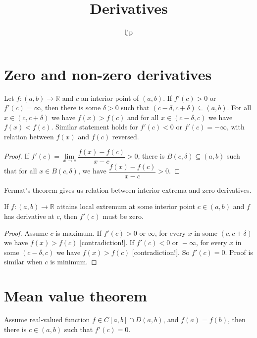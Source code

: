 \documentclass{article}
\title{Derivatives}
\author{ljp}
\newcommand{\R}{\mathbb R}
\begin{document}
\maketitle
\tableofcontents
\section{Zero and non-zero derivatives}
\begin{theorem}
    Let $ f \colon (a, b) \to \R $ and $ c $ an interior point of $ (a, b) $. If $ f'(c) > 0 $ or $ f'(c) = \infty $, then there is some $ \delta > 0 $ such that $ (c - \delta, c + \delta) \subseteq (a, b) $. For all $ x \in (c, c + \delta) $ we have $ f(x) > f(c) $ and for all $ x \in (c - \delta, c) $ we have $ f(x) < f(c) $. Similar statement holds for $ f'(c) < 0 $ or $ f'(c) = -\infty $, with relation between $ f(x) $ and $ f(c) $ reversed.
\end{theorem}

\begin{proof}
    If $ f'(c) = \lim\limits_{x \to c} \dfrac{f(x) - f(c)}{x - c} > 0 $, there is $ B(c, \delta) \subseteq (a, b) $ such that for all $ x \in B(c, \delta) $, we have $ \dfrac{f(x) - f(c)}{x - c} > 0 $.
\end{proof}

Fermat's theorem gives us relation between interior extrema and zero derivatives.
\begin{theorem}
    If $ f \colon (a, b) \to \R $ attains local extremum at some interior point $ c \in (a, b) $ and $ f $ has derivative at $ c $, then $ f'(c) $ must be zero.
\end{theorem}

\begin{proof}
    Assume $ c $ is maximum. If $ f'(c) > 0 \text{ or } \infty $, for every $ x $ in some $ (c, c + \delta) $ we have $ f(x) > f(c) $ [contradiction!]. If $ f'(c) < 0 \text{ or } -\infty $, for every $ x $ in some $ (c - \delta, c) $ we have $ f(x) > f(c) $ [contradiction!]. So $ f'(c) = 0 $. Proof is similar when $ c $ is minimum.
\end{proof}

\section{Mean value theorem}
\begin{theorem}
    Assume real-valued function $ f \in C[a, b] \cap D(a, b) $, and $ f(a) = f(b) $, then there is $ c \in (a, b) $ such that $ f'(c) = 0 $.
\end{theorem}
\end{document}
